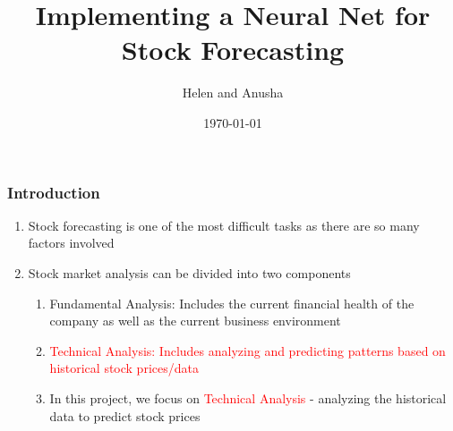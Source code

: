 \documentclass{beamer}
\title{Implementing a Neural Net for Stock Forecasting}
\author{Helen and Anusha}
\date{\today}
\begin{document}
\frame{\titlepage}




\frame
{
 \frametitle{Introduction}
 
 \begin{enumerate}
\item Stock forecasting is one of the most difficult tasks as there are so many factors involved
\item Stock market analysis can be divided into two components
\begin{enumerate}
\item Fundamental Analysis: Includes the current financial health of the company as well as the current business environment
\item \textcolor{red}{Technical Analysis:  Includes analyzing and predicting patterns based on historical stock prices/data}
\item In this project, we focus on \textcolor{red}{Technical Analysis} - analyzing the historical data to predict stock prices
\end{enumerate}

\end{enumerate}

 
 }
\end{document}
